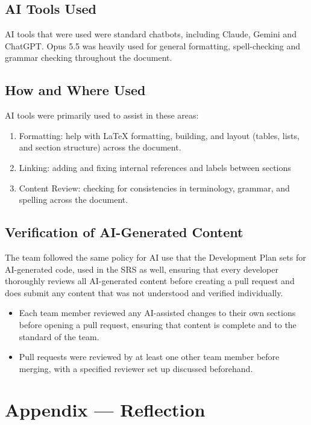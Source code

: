 \documentclass[12pt, titlepage]{article}
\begin{document}
\subsection{AI Tools Used}

AI tools that were used were standard chatbots, including Claude, Gemini and ChatGPT. 
Opus 5.5 was heavily used for general formatting, spell-checking and grammar checking throughout the document.

\subsection{How and Where Used}

AI tools were primarily used to assist in these areas:
\begin{enumerate}
  \item Formatting: help with LaTeX formatting, building, and layout (tables,
lists, and section structure) across the document.
  \item Linking: adding and fixing internal references and labels between sections
  \item Content Review: checking for consistencies in terminology, grammar, and spelling across the document.
\end{enumerate}

\subsection{Verification of AI-Generated Content}

The team followed the same policy for AI use that the Development Plan sets
for AI-generated code, used in the SRS as well, ensuring that every developer 
thoroughly reviews all AI-generated content before creating a pull request and does submit any 
content that was not understood and verified individually.

\begin{itemize}
  \item Each team member reviewed any AI-assisted changes to their own
  sections before opening a pull request, ensuring that content is complete and to the standard of the team.
  \item Pull requests were reviewed by at least one other team member before merging, with a specified reviewer set up discussed beforehand.
\end{itemize}


\newpage{}

\section{Appendix --- Reflection}
\end{document}
